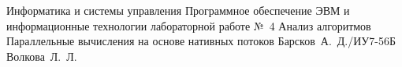 \documentclass{bmstu}
\begin{document}
	\makereporttitle
	{Информатика и системы управления} %
	{Программное обеспечение ЭВМ и информационные технологии} %
	{лабораторной работе №~4} %
	{Анализ алгоритмов} %
	{Параллельные вычисления на основе нативных потоков} %
	{} %
	{Барсков~А.~Д./ИУ7-56Б} %
	{Волкова~Л.~Л.}
	
	
	
	\makebibliography
\end{document}

